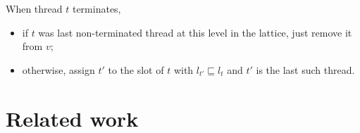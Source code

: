 \documentclass[10pt,preprint]{sigplanconf}
\newtheorem{theorem}{Theorem}
\begin{document}
When thread $t$ terminates,

\begin{itemize}
  \item if $t$ was last non-terminated thread at this level in the lattice, just remove it from $v$;
  \item otherwise, assign $t'$ to the slot of $t$ with $l_{t'} \sqsubseteq l_t$ and $t'$ is the last such thread.
\end{itemize}







\section{Related work}
\end{document}
